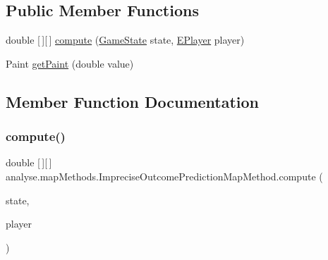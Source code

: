 \subsection*{Public Member Functions}
\begin{DoxyCompactItemize}
\item 
double \mbox{[}$\,$\mbox{]}\mbox{[}$\,$\mbox{]} \mbox{\hyperlink{classanalyse_1_1map_methods_1_1_imprecise_outcome_prediction_map_method_ac10aaad7dc1b63b9cb518b93c5d2b1a3}{compute}} (\mbox{\hyperlink{classgame_1_1game_state_1_1_game_state}{Game\+State}} state, \mbox{\hyperlink{enumgame_1_1_e_player}{E\+Player}} player)
\item 
Paint \mbox{\hyperlink{classanalyse_1_1map_methods_1_1_imprecise_outcome_prediction_map_method_a15f78aca0ee7a41b811c3cc3342beca7}{get\+Paint}} (double value)
\end{DoxyCompactItemize}


\subsection{Member Function Documentation}
\mbox{\label{classanalyse_1_1map_methods_1_1_imprecise_outcome_prediction_map_method_ac10aaad7dc1b63b9cb518b93c5d2b1a3}} 
\subsubsection{\texorpdfstring{compute()}{compute()}}
{\footnotesize\ttfamily double \mbox{[}$\,$\mbox{]}\mbox{[}$\,$\mbox{]} analyse.\+map\+Methods.\+Imprecise\+Outcome\+Prediction\+Map\+Method.\+compute (\begin{DoxyParamCaption}\item[{\mbox{\hyperlink{classgame_1_1game_state_1_1_game_state}{Game\+State}}}]{state,  }\item[{\mbox{\hyperlink{enumgame_1_1_e_player}{E\+Player}}}]{player }\end{DoxyParamCaption})\hspace{0.3cm}{\ttfamily [inline]}}



